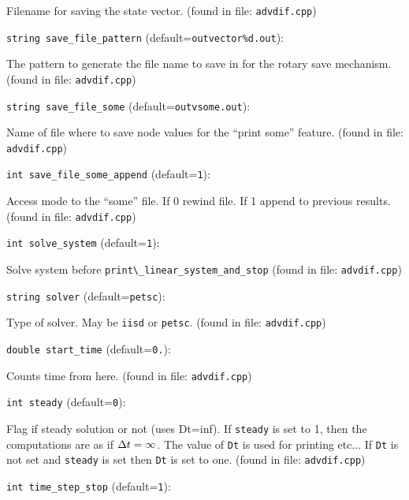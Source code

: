 Filename for saving the state vector.
 (found in file: \verb+advdif.cpp+)
\item\verb+string save_file_pattern+ {\rm(default=\verb|outvector%d.out|)}:

The pattern to generate the file name to save in for
the rotary save mechanism.
 (found in file: \verb+advdif.cpp+)
\item\verb+string save_file_some+ {\rm(default=\verb|outvsome.out|)}:

Name of file where to save node values for the ``print some'' 
feature. 
 (found in file: \verb+advdif.cpp+)
\item\verb+int save_file_some_append+ {\rm(default=\verb|1|)}:

Access mode to the ``some'' file. If 0 rewind file. If 1 
 append to previous  results.
 (found in file: \verb+advdif.cpp+)
\item\verb+int solve_system+ {\rm(default=\verb|1|)}:

Solve system before \verb+print\_linear_system_and_stop+
 (found in file: \verb+advdif.cpp+)
\item\verb+string solver+ {\rm(default=\verb|petsc|)}:

Type of solver. May be \verb+iisd+ or \verb+petsc+. 
 (found in file: \verb+advdif.cpp+)
\item\verb+double start_time+ {\rm(default=\verb|0.|)}:

Counts time from here.
 (found in file: \verb+advdif.cpp+)
\item\verb+int steady+ {\rm(default=\verb|0|)}:

Flag if steady solution or not (uses Dt=inf). If \verb+steady+
is set to 1, then the computations are as if ${\Delta t}=\infty$. 
The value of \verb+Dt+ is used for printing etc... If \verb+Dt+
is not set and \verb+steady+ is set then \verb+Dt+ is set to one.
 (found in file: \verb+advdif.cpp+)
\item\verb+int time_step_stop+ {\rm(default=\verb|1|)}:


